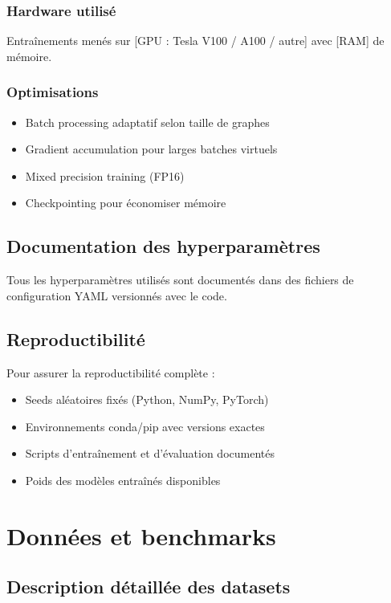 \subsection{Hardware utilisé}
Entraînements menés sur [GPU : Tesla V100 / A100 / autre] avec [RAM] de mémoire.

\subsection{Optimisations}
\begin{itemize}
    \item Batch processing adaptatif selon taille de graphes
    \item Gradient accumulation pour larges batches virtuels
    \item Mixed precision training (FP16)
    \item Checkpointing pour économiser mémoire
\end{itemize}

\section{Documentation des hyperparamètres}

Tous les hyperparamètres utilisés sont documentés dans des fichiers de configuration YAML versionnés avec le code.

\section{Reproductibilité}

Pour assurer la reproductibilité complète :
\begin{itemize}
    \item Seeds aléatoires fixés (Python, NumPy, PyTorch)
    \item Environnements conda/pip avec versions exactes
    \item Scripts d'entraînement et d'évaluation documentés
    \item Poids des modèles entraînés disponibles
\end{itemize}

\chapter{Données et benchmarks}

\section{Description détaillée des datasets}

